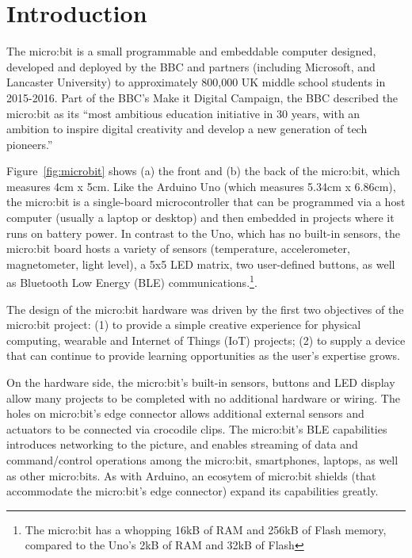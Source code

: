 \section{Introduction}
\label{sec:intrp}


The micro:bit is a small programmable and embeddable computer designed, 
developed and deployed by the BBC and partners (including Microsoft, 
and Lancaster University) to approximately 800,000 UK middle school students
in 2015-2016. Part of the BBC's Make it Digital Campaign, the BBC described the
micro:bit as its ``most ambitious education initiative in 30 years, 
with an ambition to inspire digital creativity and 
develop a new generation of tech pioneers.''~\cite{BBCwebsite}


Figure~\ref{fig:microbit} shows (a) the front and (b) the back of the
micro:bit, which measures 4cm x 5cm. Like the Arduino Uno 
(which measures 5.34cm x 6.86cm), the micro:bit is a single-board microcontroller 
that can be programmed via a host computer (usually a laptop or desktop)
and then embedded in projects where it runs on battery power.
In contrast to the Uno, which has no built-in sensors, the micro:bit 
board hosts a variety of sensors (temperature, accelerometer, magnetometer, light level), 
a 5x5 LED matrix, two user-defined buttons, as well as Bluetooth
Low Energy (BLE) communications.\footnote{The micro:bit has a whopping
16kB of RAM and 256kB of Flash memory, compared to the Uno's 2kB of 
RAM and 32kB of Flash}.

The design of the micro:bit hardware was driven by the
first two objectives of the micro:bit project:
(1) to provide a simple creative experience for physical computing, wearable and Internet of Things (IoT) projects;
(2) to supply a device that can continue to provide learning opportunities as the user's expertise grows.

On the hardware side, the micro:bit's built-in sensors, buttons and LED display 
allow many projects to be completed with no additional hardware or wiring. 
The holes on micro:bit's edge
connector allows additional external sensors and actuators to be connected via crocodile clips.
The micro:bit's BLE capabilities introduces networking to the
picture, and enables streaming of data and command/control operations among the micro:bit, 
smartphones, laptops, as well as other micro:bits.
As with Arduino, an ecosytem of micro:bit shields (that accommodate the micro:bit's edge
connector) expand its capabilities greatly. 

